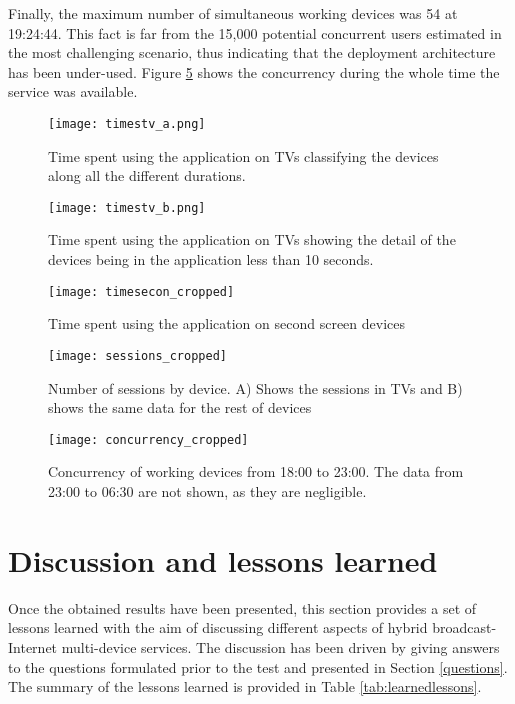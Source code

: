 Finally, the maximum number of simultaneous working devices was 54 at 19:24:44. This fact is far from the 15,000 potential concurrent users estimated in the most challenging scenario, thus indicating that the deployment architecture has been under-used. Figure \ref{fig:concurrency} shows the concurrency during the whole time the service was available.

\begin{figure}
	\centering
	\texttt{[image: timestv\_a.png]}
	\caption{Time spent using the application on TVs classifying the devices along all the different durations.}
	\label{fig:tvtimes_a}
\end{figure}

\begin{figure}
	\centering
	\texttt{[image: timestv\_b.png]}
	\caption{Time spent using the application on TVs showing the detail of the devices being in the application less than 10 seconds.}
	\label{fig:tvtimes_b}
\end{figure}

\begin{figure}
	\centering
	\texttt{[image: timesecon\_cropped]}
	\caption{Time spent using the application on second screen devices}
	\label{fig:2stimes}
\end{figure}

\begin{figure}	
	\centering
	\texttt{[image: sessions\_cropped]}
	\caption{Number of sessions by device. A) Shows the sessions in TVs and B) shows the same data for the rest of devices}
	\label{fig:sessions}
\end{figure}

\begin{figure}
	\centering
	\texttt{[image: concurrency\_cropped]}
	\caption{Concurrency of working devices from 18:00 to 23:00. The data from 23:00 to 06:30 are not shown, as they are negligible.}
	\label{fig:concurrency}
\end{figure}

\section{Discussion and lessons learned}\label{discussion}
Once the obtained results have been presented, this section provides a set of lessons learned with the aim of discussing different aspects of hybrid broadcast-Internet multi-device services. The discussion has been driven by giving answers to the questions formulated prior to the test and presented in Section \ref{questions}. The summary of the lessons learned is provided in Table \ref{tab:learnedlessons}.


